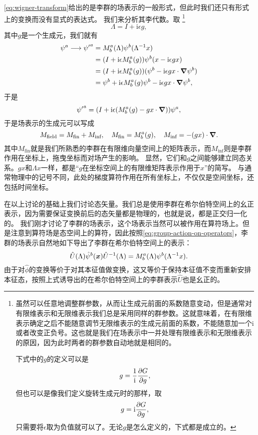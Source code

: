 \documentclass[hyperref, UTF8, a4paper]{ctexart}
\newcommand*{\ii}{\mathrm{i}}
\begin{document}
\eqref{eq:wigner-transform}给出的是李群的场表示的一般形式，但此时我们还只有形式上的变换而没有显式的表达式。
我们来分析其李代数。取%
\footnote{虽然可以任意地调整群参数，从而让生成元前面的系数随意变动，但是通常对有限维表示和无限维表示我们总是采用同样的群参数。这就意味着，在有限维表示确定之后不能随意调节无限维表示的生成元前面的系数，不能随意加一个$\ii$或者改变正负号。这也就是我们在场表示中一并处理有限维表示和无限维表示的原因，因为此时两者的群参数自动地就是相同的。

下式中的$g$的定义可以是\[
    g = \frac{1}{\ii} \pdv{G}{g},
\]
但也可以是像我们定义旋转生成元时的那样，取
\[
    g = \ii \pdv{G}{g},
\]
只需要将$\epsilon$取为负值就可以了。无论$g$是怎么定义的，下式都是成立的。}%
\[
    \Lambda = I + \ii \epsilon g,
\]
其中$g$是一个生成元，我们就有
\[
    \begin{aligned}
        \psi^a \longrightarrow {\psi'}^a &= M^a_b (\Lambda) \psi^b (\Lambda^{-1} x) \\
        &= (I + \ii \epsilon M^a_b(g)) \psi^b (x - \ii \epsilon g x) \\
        &= (I + \ii \epsilon M^a_b(g)) (\psi^b - \ii \epsilon g x \cdot \grad{\psi^b}) \\
        &= \psi^b + \ii \epsilon M^a_b(g) \psi^b - \ii \epsilon g x \cdot \grad{\psi^b},
    \end{aligned}
\]
于是
\[
    {\psi'}^a = (I + \ii \epsilon  (M^a_b(g) - g x \cdot \grad)) \psi^a,
\]
于是场表示的生成元可以写成
\begin{equation}
    M_\text{field} = M_\text{fin} + M_\text{inf}, \quad M_\text{fin} = M^a_b(g), \quad M_\text{inf} = - (g x) \cdot \grad.
    \label{eq:fin-and-inf-rep}
\end{equation}
其中$M_\text{fin}$就是我们所熟悉的李群在有限维向量空间上的矩阵表示，而$M_\text{inf}$则是李群作用在坐标上，拖曳坐标而对场产生的影响。
显然，它们和$g$之间能够建立同态关系。$gx$和$\Lambda x$一样，都是“$g$在坐标空间上的有限维矩阵表示作用于$x$”的简写。
与通常物理中的记号不同，此处的梯度算符作用在所有坐标上，不仅仅是空间坐标，还包括时间坐标。

在以上讨论的基础上我们讨论态矢量。我们总是使用李群在希尔伯特空间上的幺正表示，因为需要保证变换前后的态矢量都是物理的，也就是说，都是正交归一化的。
我们刚才讨论了李群的场表示，这个场表示当然可以被作用在算符场上。但是注意到算符场是态空间上的算符，因此按照\eqref{eq:group-action-on-operators}，李群的场表示自然地如下导出了李群在希尔伯特空间上的表示：
\begin{equation}
    \hat{U}(\Lambda) \hat{\psi}^b(\vb*{x}) \hat{U}^{-1}(\Lambda) = M^a_b (\Lambda) \psi^b (\Lambda^{-1} x).
    \label{eq:field-rep-and-state-rep-lie-group}
\end{equation}
由于对$\hat{\phi}$的变换等价于对其本征值做变换，这又等价于保持本征值不变而重新安排本征态，按照上式诱导出的在希尔伯特空间上的李群表示$\hat{U}$也是幺正的。
\end{document}

